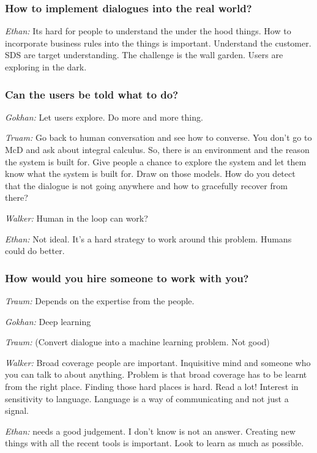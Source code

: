 \documentclass[12pt]{article}
\begin{document}
\subsubsection*{How to implement dialogues into the real world?}

{\it Ethan:} Its hard for people to understand the under the hood things. How to incorporate business rules into the things is important. Understand the customer. SDS are target understanding. The challenge is the wall garden. Users are exploring in the dark.

\subsubsection*{Can the users be told what to do?}

{\it Gokhan:} Let users explore. Do more and more thing.

{\it Truam:} Go back to human conversation and see how to converse. You don’t go to McD and ask about integral calculus. So, there is an environment and the reason the system is built for. Give people a chance to explore the system and let them know what the system is built for. Draw on those models. How do you detect that the dialogue is not going anywhere and how to gracefully recover from there?

{\it Walker:} Human in the loop can work?

{\it Ethan:} Not ideal. It’s a hard strategy to work around this problem. Humans could do better.

\subsubsection*{How would you hire someone to work with you?}

{\it Traum:} Depends on the expertise from the people.

{\it Gokhan:} Deep learning

{\it Traum:} (Convert dialogue into a machine learning problem. Not good)

{\it Walker:} Broad coverage people are important. Inquisitive mind and someone who you can talk to about anything. Problem is that broad coverage has to be learnt from the right place. Finding those hard places is hard. Read a lot! Interest in sensitivity to language. Language is a way of communicating and not just a signal.

{\it Ethan:} needs a good judgement. I don’t know is not an answer. Creating new things with all the recent tools is important. Look to learn as much as possible.
\end{document}
